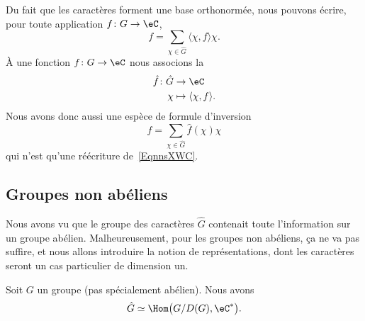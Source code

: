 Du fait que les caractères forment une base orthonormée, nous pouvons écrire, pour toute application \( f\colon G\to \eC\),
\begin{equation}    \label{EqnnsXWC}
	f=\sum_{\chi\in\hat G}\langle \chi, f\rangle \chi.
\end{equation}
À une fonction \( f\colon G\to \eC\) nous associons la 
\begin{equation}
	\begin{aligned}
		\hat f\colon \hat G & \to \eC                          \\
		\chi                & \mapsto \langle \chi, f\rangle .
	\end{aligned}
\end{equation}
Nous avons donc aussi une espèce de formule d'inversion
\begin{equation}
	f=\sum_{\chi\in\hat G}\hat f(\chi)\chi
\end{equation}
qui n'est qu'une réécriture de~\ref{EqnnsXWC}.

\subsection{Groupes non abéliens}

Nous avons vu que le groupe des caractères \( \hat G\) contenait toute l'information sur un groupe abélien. Malheureusement, pour les groupes non abéliens, ça ne va pas suffire, et nous allons introduire la notion de représentations, dont les caractères seront un cas particulier de dimension un.

\begin{proposition}
	Soit \( G\) un groupe (pas spécialement abélien). Nous avons
	\begin{equation}
		\hat G\simeq\Hom\big( G/D(G),\eC^* \big).
	\end{equation}
\end{proposition}

